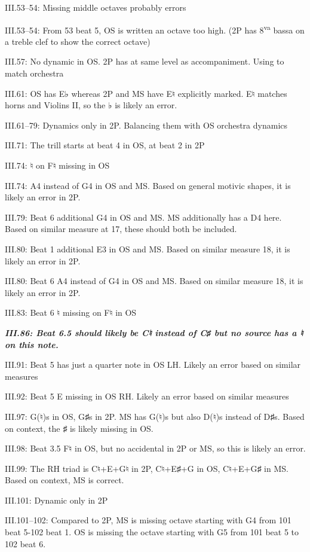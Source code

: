 \documentclass[twoside]{article}
\newcommand\dynmark[1]{\scalebox{0.9}{#1}{\kern1pt}}
\begin{document}
\begin{hangparas}{15pt}{1}
\begin{multicols}{2}
III.53--54: Missing middle octaves probably errors

III.53--54: From 53 beat 5, OS is written an octave too high. (2P has 8\textsuperscript{va} bassa on a treble clef to show the correct octave)

III.57: No dynamic in OS. 2P has \dynmark{\pp} at same level as accompaniment. Using \dynmark{\p} to match orchestra

III.61: OS has E♭ whereas 2P and MS have E♮ explicitly marked. E♮ matches horns and Violins II, so the ♭ is likely an error.

III.61--79: Dynamics only in 2P. Balancing them with OS orchestra dynamics

III.71: The trill starts at beat 4 in OS, at beat 2 in 2P

III.74: ♮ on F♮ missing in OS

III.74: A4 instead of G4 in OS and MS. Based on general motivic shapes, it is likely an error in 2P.

III.79: Beat 6 additional G4 in OS and MS. MS additionally has a D4 here. Based on similar measure at 17, these should both be included.

III.80: Beat 1 additional E3 in OS and MS. Based on similar measure 18, it is likely an error in 2P.

III.80: Beat 6 A4 instead of G4 in OS and MS. Based on similar measure 18, it is likely an error in 2P.

III.83: Beat 6 ♮ missing on F♮ in OS

\textbf{\textit{III.86: Beat 6.5 should likely be C♮ instead of C♯ but no source has a ♮ on this note.}}

III.91: Beat 5 has just a quarter note in OS LH. Likely an error based on similar measures

III.92: Beat 5 E missing in OS RH. Likely an error based on similar measures

III.97: G(♮)s in OS, G♯s in 2P. MS has G(♮)s but also D(♮)s instead of D♯s. Based on context, the ♯ is likely missing in OS.

III.98: Beat 3.5 F♮ in OS, but no accidental in 2P or MS, so this is likely an error.

III.99: The RH triad is C♮+E+G♮ in 2P, C♮+E♯+G in OS, C♮+E+G♯ in MS. Based on context, MS is correct.

III.101: Dynamic only in 2P

III.101--102: Compared to 2P, MS is missing octave starting with G4 from 101 beat 5-102 beat 1. OS is missing the octave starting with G5 from 101 beat 5 to 102 beat 6.


\end{multicols}
\end{hangparas}
\end{document}
